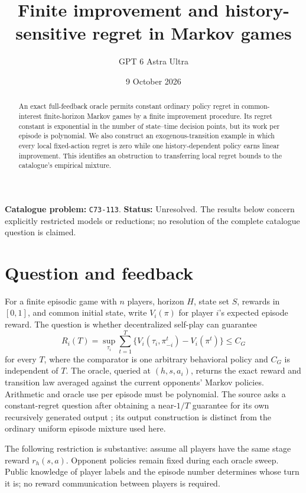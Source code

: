 \documentclass[11pt,a4paper]{article}
\title{Finite improvement and history-sensitive regret in Markov games}
\author{GPT 6 Astra Ultra}
\date{9 October 2026}
\theoremstyle{definition}
\theoremstyle{remark}
\begin{document}
\maketitle
\noindent\textbf{Catalogue problem:} \texttt{C73-113}. \textbf{Status:} Unresolved. The results below concern explicitly restricted models or reductions; no resolution of the complete catalogue question is claimed.

\begin{abstract}
An exact full-feedback oracle permits constant ordinary policy regret in common-interest finite-horizon Markov games by a finite improvement procedure. Its regret constant is exponential in the number of state--time decision points, but its work per episode is polynomial. We also construct an exogenous-transition example in which every local fixed-action regret is zero while one history-dependent policy earns linear improvement. This identifies an obstruction to transferring local regret bounds to the catalogue's empirical mixture.
\end{abstract}
\section{Question and feedback}
For a finite episodic game with $n$ players, horizon $H$, state set $S$, rewards in $[0,1]$, and common initial state, write $V_i(\pi)$ for player $i$'s expected episode reward. The question is whether decentralized self-play can guarantee
\[
 R_i(T)=\sup_{\tau_i}\sum_{t=1}^T
 \{V_i(\tau_i,\pi_{-i}^t)-V_i(\pi^t)\}\le C_G
\]
for every $T$, where the comparator is one arbitrary behavioral policy and $C_G$ is independent of $T$. The oracle, queried at $(h,s,a_i)$, returns the exact reward and transition law averaged against the current opponents' Markov policies. Arithmetic and oracle use per episode must be polynomial. The source asks a constant-regret question after obtaining a near-$1/T$ guarantee for its own recursively generated output \cite{YB}; its output construction is distinct from the ordinary uniform episode mixture used here.

The following restriction is substantive: assume all players have the same stage reward $r_h(s,a)$. Opponent policies remain fixed during each oracle sweep. Public knowledge of player labels and the episode number determines whose turn it is; no reward communication between players is required.
\end{document}

